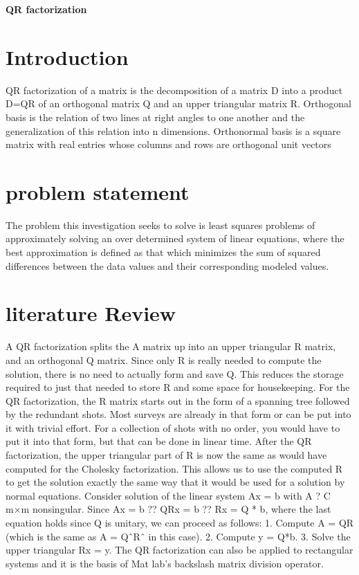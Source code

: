 \documentclass[10]{article}
\begin{document}
\begin{title}
\huge{\bfseries QR factorization}
\end{title}
\author{BAMUZIBIRE SOLOMON MUKISA,14/U/3938/PS,214015782}
\section{Introduction}
QR factorization of a matrix is the decomposition of a matrix D into a product D=QR of an orthogonal matrix Q and an upper triangular matrix R.
Orthogonal basis is the relation of two lines at right angles to one another and the generalization of this relation into n dimensions.
Orthonormal basis is a square matrix with real entries whose columns and rows are orthogonal unit vectors
\section{problem statement}
The problem this investigation seeks to solve is least squares problems of approximately solving an over determined system of linear equations, where the best approximation is defined as that which minimizes the sum of squared differences between the data values and their corresponding modeled values.

\section{literature Review}
A QR factorization splits the A matrix up into an upper triangular R matrix, and an orthogonal Q matrix. Since only R is really needed to compute the solution, there is no need to actually form and save Q. This reduces the storage required to just that needed to store R and some space for housekeeping.
For the QR factorization, the R matrix starts out in the form of a spanning tree followed by the redundant shots. Most surveys are already in that form or can be put into it with trivial effort. For a collection of shots with no order, you would have to put it into that form, but that can be done in linear time.
After the QR factorization, the upper triangular part of R is now the same as would have computed for the Cholesky factorization. This allows us to use the computed R to get the solution exactly the same way that it would be used for a solution by normal equations.
Consider solution of the linear system Ax = b with A ? C m×m nonsingular.
Since Ax = b ?? QRx = b ?? Rx = Q * b, where the last equation holds since Q is unitary, we can proceed as follows:
 1. Compute A = QR (which is the same as A = QˆRˆ in this case).
 2. Compute y = Q*b.
 3. Solve the upper triangular Rx = y.
 The QR factorization can also be applied to rectangular systems and it is the basis of Mat lab’s backslash matrix division operator.
\end{document}
